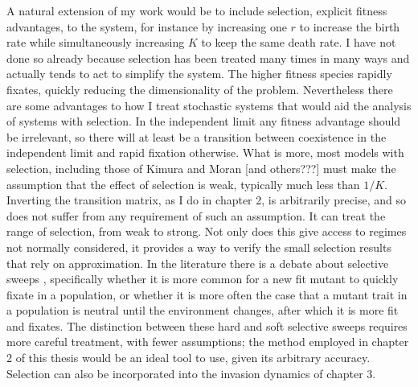 A natural extension of my work would be to include selection, explicit fitness advantages, to the system, for instance by increasing one $r$ to increase the birth rate while simultaneously increasing $K$ to keep the same death rate. 
I have not done so already because selection has been treated many times in many ways \cite{a bunch???} and actually tends to act to simplify the system. 
The higher fitness species rapidly fixates, quickly reducing the dimensionality of the problem. 
Nevertheless there are some advantages to how I treat stochastic systems that would aid the analysis of systems with selection. 
In the independent limit any fitness advantage should be irrelevant, so there will at least be a transition between coexistence in the independent limit and rapid fixation otherwise. 
What is more, most models with selection, including those of Kimura \cite{Kimura??} and Moran \cite{Moran with selection??} [and others???] must make the assumption that the effect of selection is weak, typically much less than $1/K$. 
Inverting the transition matrix, as I do in chapter 2, is arbitrarily precise, and so does not suffer from any requirement of such an assumption. It can treat the range of selection, from weak to strong. 
Not only does this give access to regimes not normally considered, it provides a way to verify the small selection results that rely on approximation. 
In the literature there is a debate about selective sweeps \cite{Jensen2014}, specifically whether it is more common for a new fit mutant to quickly fixate in a population, or whether it is more often the case that a mutant trait in a population is neutral until the environment changes, after which it is more fit and fixates. 
The distinction between these hard and soft selective sweeps requires more careful treatment, with fewer assumptions; the method employed in chapter 2 of this thesis would be an ideal tool to use, given its arbitrary accuracy. 
Selection can also be incorporated into the invasion dynamics of chapter 3. 

